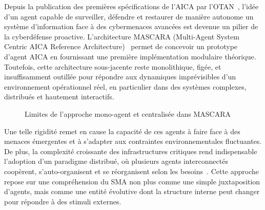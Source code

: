 \documentclass[ twoside,openright,titlepage,numbers=noenddot,headinclude,%
                footinclude=true,cleardoublepage=empty,abstractoff, %
                BCOR=5mm,paper=a4,fontsize=11pt,%
                french,american,%
                ]{scrreprt}
\begin{document}

Depuis la publication des premières spécifications de l'AICA par l'OTAN~\cite{AICAGuide2022}, l'idée d'un agent capable de surveiller, défendre et restaurer de manière autonome un système d'information face à des cybermenaces avancées est devenue un pilier de la cyberdéfense proactive. L'architecture MASCARA (Multi-Agent System Centric AICA Reference Architecture)~\cite{MASCARA2022} permet de concevoir un prototype d'agent AICA en fournissant une première implémentation modulaire théorique. Toutefois, cette architecture sous-jacente reste monolithique, figée, et insuffisamment outillée pour répondre aux dynamiques imprévisibles d'un environnement opérationnel réel, en particulier dans des systèmes complexes, distribués et hautement interactifs.

\begin{figure}[h]
    \centering
    \caption{Limites de l'approche mono-agent et centralisée dans MASCARA}
    \label{fig:mascara-limit}
\end{figure}

Une telle rigidité remet en cause la capacité de ces agents à faire face à des menaces émergentes et à s'adapter aux contraintes environnementales fluctuantes. De plus, la complexité croissante des infrastructures critiques rend indispensable l'adoption d'un paradigme distribué, où plusieurs agents interconnectés coopèrent, s'auto-organisent et se réorganisent selon les besoins~\cite{Ferber1999, Gleizes2008}. Cette approche repose sur une compréhension du SMA non plus comme une simple juxtaposition d'agents, mais comme une entité évolutive dont la structure interne peut changer pour répondre à des stimuli externes.
\end{document}
